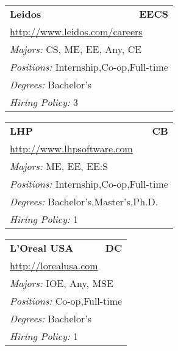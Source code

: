 \documentclass[twoside]{article}
\begin{document}
\begin{center}
\begin{multicols}{3}
\begin{FlushLeft}
\begin{minipage}{\columnwidth}
\end{minipage}
 
\begin{minipage}{\columnwidth}\begin{tabularx}{.95\columnwidth}{Xr}
                 {\Large\bf Leidos} & {\Large\bf EECS}\\
    \multicolumn{2}{p{.95\columnwidth}}{\url{http://www.leidos.com/careers}}\\
    \multicolumn{2}{p{.95\columnwidth}}{\emph{Majors:} CS, ME, EE, Any, CE}\\
    \multicolumn{2}{p{.95\columnwidth}}{\emph{Positions:} Internship,Co-op,Full-time}\\
    \multicolumn{2}{p{.95\columnwidth}}{\emph{Degrees:} Bachelor's}\\
    \multicolumn{2}{p{.95\columnwidth}}{\emph{Hiring Policy:} 3}\\
    \end{tabularx}
    
\end{minipage}
 
\begin{minipage}{\columnwidth}\begin{tabularx}{.95\columnwidth}{Xr}
                 {\Large\bf LHP} & {\Large\bf CB}\\
    \multicolumn{2}{p{.95\columnwidth}}{\url{http://www.lhpsoftware.com}}\\
    \multicolumn{2}{p{.95\columnwidth}}{\emph{Majors:} ME, EE, EE:S}\\
    \multicolumn{2}{p{.95\columnwidth}}{\emph{Positions:} Internship,Co-op,Full-time}\\
    \multicolumn{2}{p{.95\columnwidth}}{\emph{Degrees:} Bachelor's,Master's,Ph.D.}\\
    \multicolumn{2}{p{.95\columnwidth}}{\emph{Hiring Policy:} 1}\\
    \end{tabularx}
    
\end{minipage}
 
\begin{minipage}{\columnwidth}\begin{tabularx}{.95\columnwidth}{Xr}
                 {\Large\bf L'Oreal USA} & {\Large\bf DC}\\
    \multicolumn{2}{p{.95\columnwidth}}{\url{http://lorealusa.com}}\\
    \multicolumn{2}{p{.95\columnwidth}}{\emph{Majors:} IOE, Any, MSE}\\
    \multicolumn{2}{p{.95\columnwidth}}{\emph{Positions:} Co-op,Full-time}\\
    \multicolumn{2}{p{.95\columnwidth}}{\emph{Degrees:} Bachelor's}\\
    \multicolumn{2}{p{.95\columnwidth}}{\emph{Hiring Policy:} 1}\\
    \end{tabularx}
    

\end{minipage}
\end{FlushLeft}
\end{multicols}
\end{center}
\end{document}
